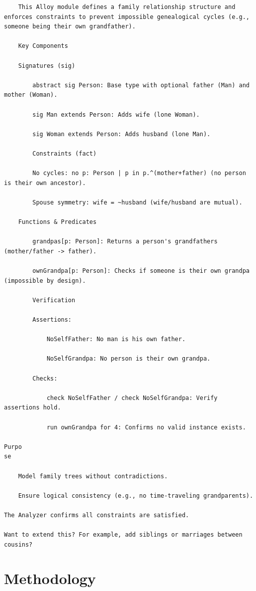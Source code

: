 \documentclass[conference]{IEEEtran}
\begin{document}
\begin{lstlisting}
    This Alloy module defines a family relationship structure and enforces constraints to prevent impossible genealogical cycles (e.g., someone being their own grandfather).

    Key Components

    Signatures (sig)

        abstract sig Person: Base type with optional father (Man) and mother (Woman).

        sig Man extends Person: Adds wife (lone Woman).

        sig Woman extends Person: Adds husband (lone Man).

        Constraints (fact)

        No cycles: no p: Person | p in p.^(mother+father) (no person is their own ancestor).

        Spouse symmetry: wife = ~husband (wife/husband are mutual).

    Functions & Predicates

        grandpas[p: Person]: Returns a person's grandfathers (mother/father -> father).

        ownGrandpa[p: Person]: Checks if someone is their own grandpa (impossible by design).

        Verification

        Assertions:

            NoSelfFather: No man is his own father.

            NoSelfGrandpa: No person is their own grandpa.

        Checks:

            check NoSelfFather / check NoSelfGrandpa: Verify assertions hold.

            run ownGrandpa for 4: Confirms no valid instance exists.

Purpo
se

    Model family trees without contradictions.

    Ensure logical consistency (e.g., no time-traveling grandparents).

The Analyzer confirms all constraints are satisfied.

Want to extend this? For example, add siblings or marriages between cousins?

\end{lstlisting}

\section{Methodology}
\end{document}
